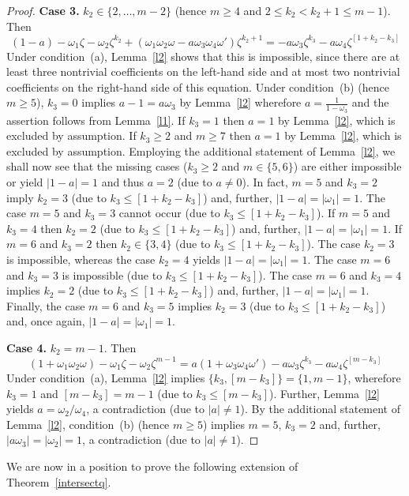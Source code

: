 \documentclass[a4paper]{amsart}
\theoremstyle{definition}
\numberwithin{equation}{section}
\numberwithin{theorem}{section}
\begin{document}
\begin{proof}
{\bf Case 3.} $k_2\in\{2,\dots,m-2\}$ (hence $m\geq 4$ and $2\leq
k_2<k_2+1\leq m-1$). Then
$$
(1-a)-\omega_1\zeta-\omega_2\zeta^{k_2}+(\omega_1\omega_2\omega-a\omega_3\omega_4\omega')\zeta^{k_2+1}=-a\omega_3\zeta^{k_3}-a\omega_4\zeta^{[1+k_2-k_3]}
$$
Under condition~(a), Lemma~\ref{l2} shows that this is impossible, since there are at least three 
nontrivial coefficients on the left-hand side and at
most two nontrivial coefficients on the right-hand side of this
equation. Under condition~(b) (hence $m\geq 5$), $k_3=0$
implies $a-1=a\omega_3$ by Lemma~\ref{l2} wherefore
$a=\frac{1}{1-\omega_3}$ and the assertion follows from
Lemma~\ref{l1}. If $k_3=1$ then $a=1$ by Lemma~\ref{l2}, which
 is excluded by assumption.  If $k_3\geq 2$
and $m\geq 7$ then $a=1$ by Lemma~\ref{l2}, which
 is excluded by assumption. Employing the additional statement of
 Lemma~\ref{l2}, we shall now see that the
missing cases ($k_3\geq 2$ and $m\in\{5,6\}$) are either impossible or yield 
$|1-a|=1$ and thus $a=2$ (due to $a\neq 0$). In fact, $m=5$
and $k_3= 2$ imply $k_2=3$ (due to $k_3\leq [1+k_2-k_3]$) and, further,
$|1-a|=|\omega_1|=1$.  The case $m=5$
and $k_3= 3$ cannot occur (due to $k_3\leq [1+k_2-k_3]$). If $m=5$
and $k_3= 4$ then $k_2=2$ (due to $k_3\leq [1+k_2-k_3]$) and, further,
$|1-a|=|\omega_1|=1$. If $m=6$
and $k_3= 2$ then $k_2\in\{3,4\}$ (due to $k_3\leq [1+k_2-k_3]$). The
case $k_2= 3$ is impossible, whereas the case $k_2= 4$ yields $|1-a|=|\omega_1|=1$. The case $m=6$
and $k_3= 3$ is impossible (due to $k_3\leq [1+k_2-k_3]$). The case $m=6$
and $k_3= 4$ implies $k_2=2$ (due to $k_3\leq [1+k_2-k_3]$) and, further,  $|1-a|=|\omega_1|=1$. Finally, the case $m=6$
and $k_3= 5$ implies $k_2= 3$ (due to $k_3\leq [1+k_2-k_3]$) and, once
again,  $|1-a|=|\omega_1|=1$.

{\bf Case 4.} $k_2=m-1$. Then
$$
(1+\omega_1\omega_2\omega)-\omega_1\zeta-\omega_2\zeta^{m-1}=a(1+\omega_3\omega_4\omega')-a\omega_3\zeta^{k_3}-a\omega_4\zeta^{[m-k_3]}
$$
Under condition~(a), Lemma~\ref{l2} implies
$\{k_3,[m-k_3]\}=\{1,m-1\}$, wherefore $k_3=1$ and $[m-k_3]=m-1$ (due
to $k_3\leq [m-k_3]$). Further, Lemma~\ref{l2} yields
$a=\omega_2/\omega_4$, a contradiction (due to $|a|\neq 1$). By the
additional statement of Lemma~\ref{l2}, condition~(b) (hence $m\geq 5$)
implies $m=5$, $k_3=2$ and, further, $|a\omega_3|=|\omega_2|=1$, a contradiction
(due to $|a|\neq 1$).
\end{proof}

We are now in a position to prove the following extension of Theorem~\ref{intersectq}.   
\end{document}
